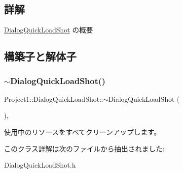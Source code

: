 \subsection{詳解}
\hyperlink{class_project1_1_1_dialog_quick_load_shot}{Dialog\+Quick\+Load\+Shot} の概要 



\subsection{構築子と解体子}
\mbox{\label{class_project1_1_1_dialog_quick_load_shot_affa8c1b282af262ffcd41d67f6509f97}} 
\subsubsection{\texorpdfstring{$\sim$\+Dialog\+Quick\+Load\+Shot()}{~DialogQuickLoadShot()}}
{\footnotesize\ttfamily Project1\+::\+Dialog\+Quick\+Load\+Shot\+::$\sim$\+Dialog\+Quick\+Load\+Shot (\begin{DoxyParamCaption}{ }\end{DoxyParamCaption})\hspace{0.3cm}{\ttfamily [inline]}, {\ttfamily [protected]}}



使用中のリソースをすべてクリーンアップします。 



このクラス詳解は次のファイルから抽出されました\+:\begin{DoxyCompactItemize}
\item 
Dialog\+Quick\+Load\+Shot.\+h\end{DoxyCompactItemize}
